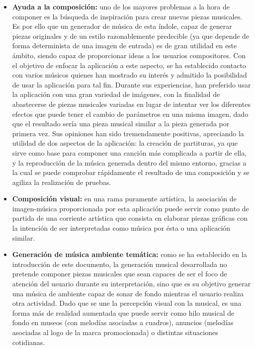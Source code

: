 \begin{itemize} 

\item\textbf{Ayuda a la composición:} uno de los mayores problemas a la hora de componer es la búsqueda de inspiración para crear nuevas piezas musicales. Es por ello que un generador de música de esta índole, capaz de generar piezas originales y de un estilo razonablemente predecible (ya que depende de forma determinista de una imagen de entrada) es de gran utilidad en  este ámbito, siendo capaz de proporcionar ideas a los usuarios compositores. Con el objetivo de enfocar la aplicación a este aspecto, se ha establecido contacto con varios músicos quienes han mostrado su interés y admitido la posibilidad de usar la aplicación para tal fin. Durante sus experiencias, han preferido usar la aplicación con una gran variedad de imágenes, con la finalidad de abastecerse de piezas musicales variadas en lugar de intentar ver los diferentes efectos que puede tener el cambio de parámetros en una misma imagen, dado que el resultado sería una pieza musical similar a la pieza generada por primera vez. Sus opiniones han sido tremendamente positivas, apreciando la utilidad de dos aspectos de la aplicación: la creación de partituras, ya que sirve como base para componer una canción más complicada a partir de ella, y la reproducción de la música generada dentro del mismo entorno, gracias a la cual se puede comprobar rápidamente el resultado de una composición y se agiliza la realización de pruebas.

\item\textbf{Composición visual:} en una rama puramente artística, la asociación de imagen-música proporcionada por esta aplicación puede servir como punto de partida de una corriente artística que consista en elaborar piezas gráficas con la intención de ser interpretadas como música por ésta o una aplicación similar.


\item\textbf{Generación de música ambiente temática:} como se ha establecido en la introducción de este documento, la generación musical desarrollada no pretende componer piezas musicales que sean capaces de ser el foco de atención del usuario durante su interpretación, sino que es su objetivo generar una música de ambiente capaz de sonar de fondo mientras el usuario realiza otra actividad. Dado que se une la percepción visual con la musical, es una forma más de realidad aumentada que puede servir como hilo musical de fondo en museos (con melodías asociadas a cuadros), anuncios (melodías asociadas al logo de la marca promocionada) o distintas situaciones cotidianas.


\end{itemize}
